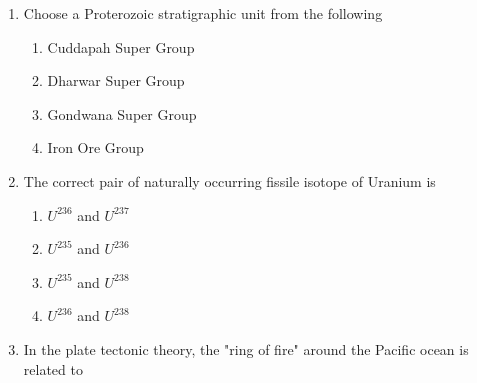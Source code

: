 \documentclass[journal,12pt,onecolumn]{IEEEtran}
\theoremstyle{remark}
\begin{document}
\begin{enumerate}
    \hfill{}
    
    \begin{multicols}{4}
        \begin{enumerate}
            \item Calcite
            \item Fluorite
            \item Gypsum
            \item Quartz
        \end{enumerate}
    \end{multicols}

    \item Choose a Proterozoic stratigraphic unit from the following

    \hfill{}
    
    \begin{multicols}{2}
        \begin{enumerate}
            \item Cuddapah Super Group
            \item Dharwar Super Group
            \item Gondwana Super Group
            \item Iron Ore Group
        \end{enumerate}
    \end{multicols}

\newpage

    \item The correct pair of naturally occurring fissile isotope of Uranium is

    \hfill{}
    
    \begin{multicols}{2}
        \begin{enumerate}
            \item $U^{236}$ and $U^{237}$
            \item $U^{235}$ and $U^{236}$
            \item $U^{235}$ and $U^{238}$
            \item $U^{236}$ and $U^{238}$
        \end{enumerate}
    \end{multicols}

    \item In the plate tectonic theory, the "ring of fire" around the Pacific ocean is related to

    \hfill{}
    

\end{enumerate}
\end{document}
